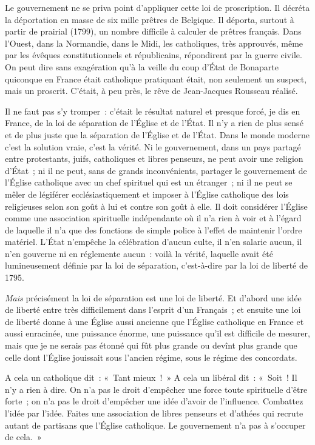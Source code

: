 \documentclass[french,twoside]{book} %
\begin{document}
Le gouvernement ne se priva point d’appliquer cette loi de proscription. Il décréta la déportation en masse de six mille prêtres de Belgique. Il déporta, surtout à partir de prairial (1799), un nombre difficile à calculer de prêtres français. Dans l’Ouest, dans la Normandie, dans le Midi, les catholiques, très approuvés, même par les évêques constitutionnels et républicains, répondirent par la guerre civile. On peut dire sans exagération qu’à la veille du coup d’État de Bonaparte quiconque en France était catholique pratiquant était,  non seulement un suspect, mais un proscrit. C’était, à peu près, le rêve de Jean-Jacques Rousseau réalisé.\par
Il ne faut pas s’y tromper : c’était le résultat naturel et presque forcé, je dis en France, de la loi de séparation de l’Église et de l’État. Il n’y a rien de plus sensé et de plus juste que la séparation de l’Église et de l’État. Dans le monde moderne c’est la solution vraie, c’est la vérité. Ni le gouvernement, dans un pays partagé entre protestants, juifs, catholiques et libres penseurs, ne peut avoir une religion d’État ; ni il ne peut, sans de grands inconvénients, partager le gouvernement de l’Église catholique avec un chef spirituel qui est un étranger ; ni il ne peut se mêler de légiférer ecclésiastiquement et imposer à l’Église catholique des lois religieuses selon son goût à lui et contre son goût à elle. Il doit considérer l’Église comme une association spirituelle indépendante où il n’a rien à voir et à l’égard de laquelle il n’a que des fonctions de simple police à l’effet de maintenir l’ordre matériel. L’État n’empêche la célébration d’aucun culte, il n’en salarie aucun, il n’en gouverne ni en réglemente aucun : voilà la vérité, laquelle avait été lumineusement définie par la loi de séparation, c’est-à-dire par la loi de liberté de 1795.\par
 {\itshape Mais} précisément la loi de séparation est une loi de liberté. Et d’abord une idée de liberté entre très difficilement dans l’esprit d’un Français ; et ensuite une loi de liberté donne à une Église aussi ancienne que l’Église catholique en France et aussi enracinée, une puissance énorme, une puissance qu’il est difficile de mesurer, mais que je ne serais pas étonné qui fût plus grande ou devînt plus grande que celle dont l’Église jouissait sous l’ancien régime, sous le régime des concordats.\par
A cela un catholique dit : « Tant mieux ! » A cela un libéral dit : « Soit ! Il n’y a rien à dire. On n’a pas le droit d’empêcher une force toute spirituelle d’être forte ; on n’a pas le droit d’empêcher une idée d’avoir de l’influence. Combattez l’idée par l’idée. Faites une association de libres penseurs et d’athées qui recrute autant de partisans que l’Église catholique. Le gouvernement n’a pas à s’occuper de cela. »\par
\end{document}

